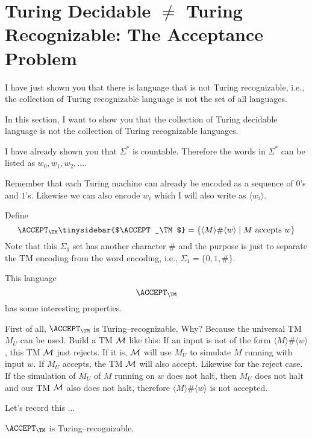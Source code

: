 \section{Turing Decidable $\neq$ 
Turing Recognizable:
The Acceptance Problem}

I have just shown you that there is language that is not
Turing recognizable, i.e., the 
collection of Turing recognizable language is not the 
set of all languages.

In this section, I want to show you
that the collection of Turing decidable language is not the 
collection of Turing recognizable languages.

I have already shown you that $\Sigma^*$ is countable.
Therefore the words in $\Sigma^*$ can be listed 
as $w_0, w_1, w_2, ...$.

Remember that each Turing machine can already be encoded as a
sequence of $0$'s and $1$'s.
Likewise we can also encode $w_i$ which I will also write
as $\langle w_i \rangle$.


Define
\[
\ACCEPT_\TM\index{accept@$\ACCEPT_\TM$}\tinysidebar{$\ACCEPT_\TM$}
= \{ \langle M \rangle \# \langle w \rangle \mid M \text{ accepts } w \}
\]
Note that this $\Sigma_1$ set has
another character $\#$ and the purpose is just to 
separate the TM encoding from the word encoding, i.e.,
$\Sigma_1 = \{0, 1, \#\}$.


This language 
\[
\ACCEPT_\TM
\]
has some interesting properties.

First of all,
$\ACCEPT_\TM$ 
is Turing--recognizable.
Why?
Because the universal TM $M_U$
can be used.
Build a TM $\cal M$
like this:
If an input is not of the form
$\langle M \rangle \# \langle w\rangle$,
this TM $\cal M$
just rejects.
If it is, $\cal M$
will use $M_U$ to simulate
$M$ running with input $w$.
If $M_U$ accepts, the TM $\cal M$ will also accept.
Likewise for the reject case.
If the simulation of $M_U$ of $M$ running on $w$
does not halt, then $M_U$ does not halt
and our TM $\cal M$ also does not halt,
therefore 
$\langle M \rangle \# \langle w\rangle$
is not accepted.

Let's record this ...

\begin{thm}
$\ACCEPT_\TM$
is Turing--recognizable.
\end{thm}

